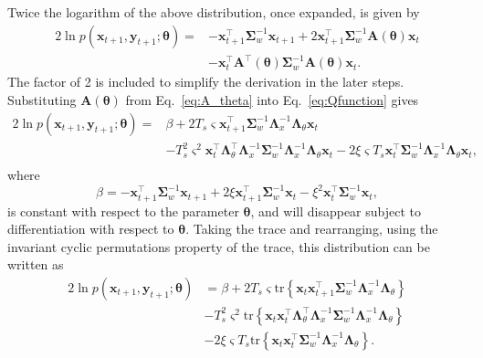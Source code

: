 \documentclass[review,authoryear,3p]{elsarticle}
\begin{document}
Twice the logarithm of the above distribution, once expanded, is given by
\begin{align}\label{eq:Qfunction}
2\ln p(\mathbf x_{t+1} , \mathbf y_{t+1};\boldsymbol\theta)=&-\mathbf x_{t+1}^\top\boldsymbol\Sigma_w^{-1}\mathbf x_{t+1}+2\mathbf x_{t+1}^\top\boldsymbol\Sigma_w^{-1}\mathbf A( \boldsymbol\theta)\mathbf x_t\nonumber \\
&-\mathbf x_t^\top\mathbf A^\top(\boldsymbol\theta)\boldsymbol\Sigma_w^{-1}\mathbf A(\boldsymbol\theta)\mathbf x_t.
\end{align}
The factor of 2 is included to simplify the derivation in the later steps. Substituting $\mathbf A( \boldsymbol\theta)$ from Eq.~\eqref{eq:A_theta} into Eq.~\eqref{eq:Qfunction} gives
\begin{align}
2\ln p(\mathbf x_{t+1}, \mathbf y_{t+1};\boldsymbol\theta)=&\beta+2 T_s\varsigma\mathbf x_{t+1}^\top\boldsymbol\Sigma_w^{-1}\boldsymbol\Lambda_x^{-1}\boldsymbol\Lambda_{\theta}\mathbf x_t \nonumber \\
&-T_s^2\varsigma^2\mathbf x_t^\top \boldsymbol\Lambda_{\theta}^\top\boldsymbol\Lambda_x^{-1}\boldsymbol\Sigma_w^{-1}\boldsymbol\Lambda_x^{-1}\boldsymbol\Lambda_{\theta}\mathbf x_t-2\xi \varsigma T_s\mathbf x_t^\top\boldsymbol\Sigma_w^{-1}\boldsymbol\Lambda_x^{-1}\boldsymbol\Lambda_{\theta}\mathbf x_t,\nonumber \\
\end{align}
where 
\begin{equation}
\beta=-\mathbf x_{t+1}^\top\boldsymbol\Sigma_w^{-1}\mathbf x_{t+1}+2\xi\mathbf x_{t+1}^\top\boldsymbol\Sigma_w^{-1}\mathbf x_t-\xi^2\mathbf x_t^\top\boldsymbol\Sigma_w^{-1}\mathbf x_t,
\end{equation}
is constant with respect to the parameter $\boldsymbol\theta$, and will disappear subject to differentiation with respect to $\boldsymbol\theta$. Taking the trace and rearranging, using the invariant cyclic permutations property of the trace, this distribution can be written as
\begin{align}\label{eq:Qfunctionintrace}
2\ln p(\mathbf x_{t+1}, \mathbf y_{t+1};\boldsymbol\theta)&=\beta+2 T_s\varsigma\mathrm{tr} \left\lbrace \mathbf x_t\mathbf x_{t+1}^\top\boldsymbol\Sigma_w^{-1}\boldsymbol\Lambda_x^{-1}\boldsymbol\Lambda_{\theta}\right\rbrace \nonumber \\
&-T_s^2\varsigma^2\mathrm{tr} \left\lbrace \mathbf x_t\mathbf x_t^\top \boldsymbol\Lambda_{\theta}^\top\boldsymbol\Lambda_x^{-1}\boldsymbol\Sigma_w^{-1}\boldsymbol\Lambda_x^{-1}\boldsymbol\Lambda_{\theta}\right\rbrace\nonumber \\
&-2\xi\varsigma T_s\mathrm{tr} \left\lbrace \mathbf x_t\mathbf x_{t}^\top\boldsymbol\Sigma_w^{-1}\boldsymbol\Lambda_x^{-1}\boldsymbol\Lambda_{\theta}\right\rbrace.
\end{align}
\end{document}
